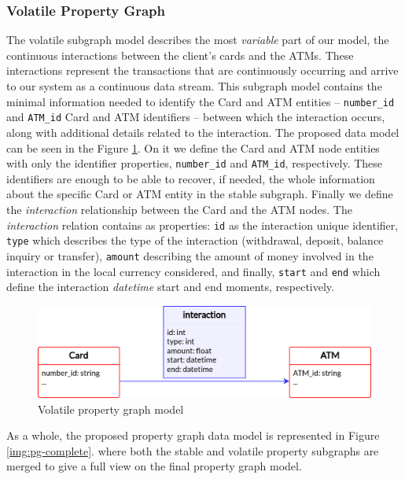 \documentclass{article}
\begin{document}
\subsubsection{Volatile Property Graph}\label{section:volatile-pg}

The volatile subgraph model describes the most \emph{variable} part of our model, the continuous interactions between the client's cards and the ATMs. These interactions represent the transactions that are continuously occurring and arrive to our system as a continuous data stream. 
This subgraph model contains the minimal information needed to identify the Card and ATM entities -- \texttt{number\_id} and \texttt{ATM\_id} Card and ATM identifiers -- between which the interaction occurs, along with additional details related to the interaction. 
The proposed data model can be seen in the Figure \ref{img:pg-volatile}. On it we define the Card and ATM node entities with only the identifier properties, \texttt{number\_id} and \texttt{ATM\_id}, respectively. These identifiers are enough to be able to recover, if needed, the whole information about the specific Card or ATM entity in the stable subgraph.
Finally we define the \emph{interaction} relationship between the Card and the ATM nodes.
The \emph{interaction} relation contains as properties: \texttt{id} as the interaction unique identifier, \texttt{type} which describes the type of the interaction (withdrawal, deposit, balance inquiry or transfer), \texttt{amount} describing the amount of money involved in the interaction in the local currency considered, and finally, \texttt{start} and \texttt{end} which define the interaction \emph{datetime} start and end moments, respectively.

\begin{figure}[h]
    \centering
    \includegraphics[scale = 0.8]{images/schema-volatile-edit.png}
    \caption{Volatile property graph model}
    \label{img:pg-volatile}
\end{figure}


As a whole, the proposed property graph data model is represented in Figure \ref{img:pg-complete}. where both the stable and volatile property subgraphs are merged to give a full view on the final property graph model.
\end{document}
